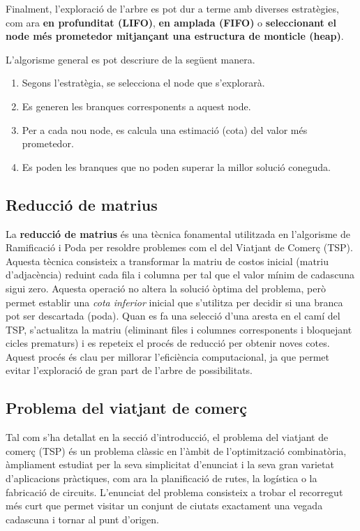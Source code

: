 \documentclass{ieeetj}
\begin{document}
Finalment, l’exploració de l’arbre es pot dur a terme amb diverses estratègies, com ara \textbf{en profunditat (LIFO)}, \textbf{en amplada (FIFO)} o \textbf{seleccionant el node més prometedor mitjançant una estructura de monticle (heap)}.\newline

L'algorisme general es pot descriure de la següent manera.
\begin{enumerate}
  \item Segons l'estratègia, se selecciona el node que s'explorarà.
  \item Es generen les branques corresponents a aquest node.
  \item Per a cada nou node, es calcula una estimació (cota) del valor més prometedor.
  \item Es poden les branques que no poden superar la millor solució coneguda.
\end{enumerate}

\subsection{Reducció de matrius}

La \textbf{reducció de matrius}\cite{reduccio-matrius} és una tècnica fonamental utilitzada en l’algorisme de Ramificació i Poda per resoldre problemes com el del Viatjant de Comerç (TSP). 
Aquesta tècnica consisteix a transformar la matriu de costos inicial (matriu d'adjacència) reduint cada fila i columna per tal que el valor mínim de cadascuna sigui zero. Aquesta operació no altera la solució òptima del problema, però permet establir una \textit{cota inferior} inicial que s’utilitza per decidir si una branca pot ser descartada (poda). Quan es fa una selecció d’una aresta en el camí del TSP, s’actualitza la matriu (eliminant files i columnes corresponents i bloquejant cicles prematurs) i es repeteix el procés de reducció per obtenir noves cotes. Aquest procés és clau per millorar l’eficiència computacional, ja que permet evitar l’exploració de gran part de l’arbre de possibilitats.

\subsection{Problema del viatjant de comerç}

Tal com s'ha detallat en la secció d'introducció, el problema del viatjant de comerç (TSP) és un problema clàssic en l'àmbit de l'optimització combinatòria, àmpliament estudiat per la seva simplicitat d'enunciat i la seva gran varietat d'aplicacions pràctiques, com ara la planificació de rutes, la logística o la fabricació de circuits. L'enunciat del problema consisteix a trobar el recorregut més curt que permet visitar un conjunt de ciutats exactament una vegada cadascuna i tornar al punt d'origen.\newline
\end{document}
